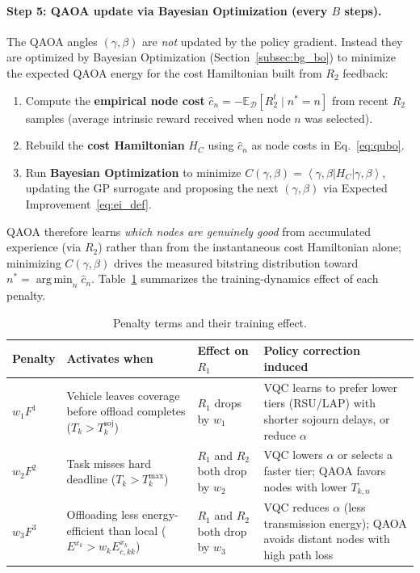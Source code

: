 \documentclass[11pt,a4paper]{article}
\theoremstyle{definition}
\DeclareMathOperator*{\argmin}{arg\,min}
\newcommand{\ket}[1]{\left\lvert #1 \right\rangle}
\newcommand{\bra}[1]{\left\langle #1 \right\rvert}
\begin{document}
\paragraph{Step 5: QAOA update via Bayesian Optimization (every $B$ steps).}
The QAOA angles $(\gamma, \beta)$ are \emph{not} updated by the policy gradient. Instead they are optimized by Bayesian Optimization (Section~\ref{subsec:bg_bo}) to minimize the expected QAOA energy for the cost Hamiltonian built from $R_2$ feedback:
\begin{enumerate}
  \item Compute the \textbf{empirical node cost} $\hat{c}_n = -\mathbb{E}_\mathcal{D}[R_2^t \mid n^* = n]$ from recent $R_2$ samples (average intrinsic reward received when node $n$ was selected).
  \item Rebuild the \textbf{cost Hamiltonian} $H_C$ using $\hat{c}_n$ as node costs in Eq.~\eqref{eq:qubo}.
  \item Run \textbf{Bayesian Optimization} to minimize $C(\gamma, \beta) = \bra{\gamma,\beta} H_C \ket{\gamma,\beta}$, updating the GP surrogate and proposing the next $(\gamma, \beta)$ via Expected Improvement~\eqref{eq:ei_def}.
\end{enumerate}
QAOA therefore learns \emph{which nodes are genuinely good} from accumulated experience (via $R_2$) rather than from the instantaneous cost Hamiltonian alone; minimizing $C(\gamma,\beta)$ drives the measured bitstring distribution toward $n^* = \argmin_n \hat{c}_n$. Table~\ref{tab:penalty_effect} summarizes the training-dynamics effect of each penalty.

\begin{table}[htbp]
\centering
\caption{Penalty terms and their training effect.}
\label{tab:penalty_effect}
\begin{tabular}{@{}p{1.6cm}p{2.8cm}p{3.5cm}p{4.2cm}@{}}
\toprule
\textbf{Penalty} & \textbf{Activates when} & \textbf{Effect on $R_1$} & \textbf{Policy correction induced} \\
\midrule
$w_1 F^1$ & Vehicle leaves coverage before offload completes ($T_k > T_k^{\mathrm{soj}}$) &
$R_1$ drops by $w_1$ &
VQC learns to prefer lower tiers (RSU/LAP) with shorter sojourn delays, or reduce $\alpha$ \\[6pt]
$w_2 F^2$ & Task misses hard deadline ($T_k > T_k^{\max}$) &
$R_1$ and $R_2$ both drop by $w_2$ &
VQC lowers $\alpha$ or selects a faster tier; QAOA favors nodes with lower $T_{k,n}$ \\[6pt]
$w_3 F^3$ & Offloading less energy-efficient than local ($E^{x_k} > w_k E_{c,kk}^{x_k}$) &
$R_1$ and $R_2$ both drop by $w_3$ &
VQC reduces $\alpha$ (less transmission energy); QAOA avoids distant nodes with high path loss \\
\bottomrule
\end{tabular}
\end{table}
\end{document}
